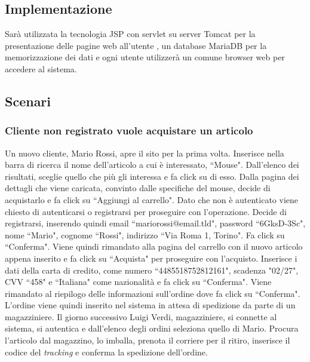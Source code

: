 \documentclass[12pt,a4paper]{article}
\begin{document}
\subsection{Implementazione}
Sarà utilizzata la tecnologia JSP con servlet su server Tomcat per la presentazione delle pagine web all'utente , un database MariaDB per la memorizzazione dei dati e ogni utente utilizzerà un comune browser web per accedere al sistema.

\newpage
\subsection{Scenari}
\subsubsection{Cliente non registrato vuole acquistare un articolo}
Un nuovo cliente, Mario Rossi, apre il sito per la prima volta.
Inserisce nella barra di ricerca il nome dell'articolo a cui è interessato, ``Mouse".
Dall'elenco dei risultati, sceglie quello che più gli interessa e fa click su di esso.
Dalla pagina dei dettagli che viene caricata, convinto dalle specifiche del mouse, decide di acquistarlo e fa click su ``Aggiungi al carrello".
Dato che non è autenticato viene chiesto di autenticarsi o registrarsi per proseguire con l'operazione.
Decide di registrarsi, inserendo quindi email ``mariorossi@email.tld", password ``6GksD-3Sc", nome ``Mario", cognome ``Rossi", indirizzo ``Via Roma 1, Torino". Fa click su ``Conferma".
Viene quindi rimandato alla pagina del carrello con il nuovo articolo appena inserito e fa click su ``Acquista" per proseguire con l'acquisto.
Inserisce i dati della carta di credito, come numero  ``4485518752812161", scadenza "02/27", CVV ``458" e ``Italiana" come nazionalità e fa click su ``Conferma".
Viene rimandato al riepilogo delle informazioni sull'ordine dove fa click su ``Conferma".
L'ordine viene quindi inserito nel sistema in attesa di spedizione da parte di un magazziniere.
Il giorno successivo Luigi Verdi, magazziniere, si connette al sistema, si autentica e dall'elenco degli ordini seleziona quello di Mario. Procura l'articolo dal magazzino, lo imballa, prenota il corriere per il ritiro, inserisce il codice del \emph{tracking} e conferma la spedizione dell'ordine.
\end{document}
